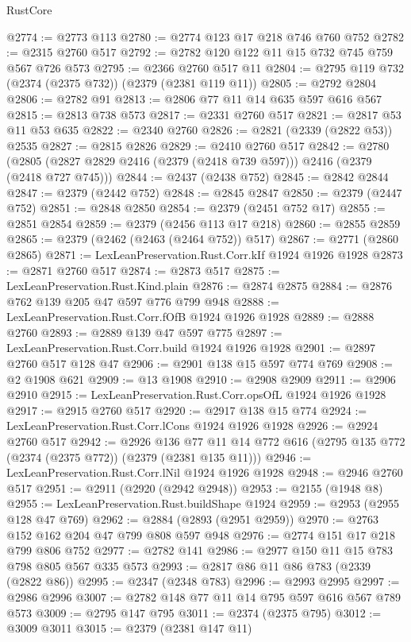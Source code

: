 \begin{lexlean}{RustCore}
\begin{coremodule}
@2774 := @2773 @113
@2780 := @2774 @123 @17 @218 @746 @760 @752
@2782 := @2315 @2760 @517
@2792 := @2782 @120 @122 @11 @15 @732 @745 @759 @567 @726 @573
@2795 := @2366 @2760 @517 @11
@2804 := @2795 @119 @732 (@2374 (@2375 @732)) (@2379 (@2381 @119 @11))
@2805 := @2792 @2804
@2806 := @2782 @91
@2813 := @2806 @77 @11 @14 @635 @597 @616 @567
@2815 := @2813 @738 @573
@2817 := @2331 @2760 @517
@2821 := @2817 @53 @11 @53 @635
@2822 := @2340 @2760
@2826 := @2821 (@2339 (@2822 @53)) @2535
@2827 := @2815 @2826
@2829 := @2410 @2760 @517
@2842 := @2780 (@2805 (@2827 @2829 @2416 (@2379 (@2418 @739 @597))) @2416 (@2379 (@2418 @727 @745)))
@2844 := @2437 (@2438 @752)
@2845 := @2842 @2844
@2847 := @2379 (@2442 @752)
@2848 := @2845 @2847
@2850 := @2379 (@2447 @752)
@2851 := @2848 @2850
@2854 := @2379 (@2451 @752 @17)
@2855 := @2851 @2854
@2859 := @2379 (@2456 @113 @17 @218)
@2860 := @2855 @2859
@2865 := @2379 (@2462 (@2463 (@2464 @752)) @517)
@2867 := @2771 (@2860 @2865)
@2871 := LexLeanPreservation.Rust.Corr.kIf @1924 @1926 @1928
@2873 := @2871 @2760 @517
@2874 := @2873 @517
@2875 := LexLeanPreservation.Rust.Kind.plain
@2876 := @2874 @2875
@2884 := @2876 @762 @139 @205 @47 @597 @776 @799 @948
@2888 := LexLeanPreservation.Rust.Corr.fOfB @1924 @1926 @1928
@2889 := @2888 @2760
@2893 := @2889 @139 @47 @597 @775
@2897 := LexLeanPreservation.Rust.Corr.build @1924 @1926 @1928
@2901 := @2897 @2760 @517 @128 @47
@2906 := @2901 @138 @15 @597 @774 @769
@2908 := @2 @1908 @621
@2909 := @13 @1908
@2910 := @2908 @2909
@2911 := @2906 @2910
@2915 := LexLeanPreservation.Rust.Corr.opsOfL @1924 @1926 @1928
@2917 := @2915 @2760 @517
@2920 := @2917 @138 @15 @774
@2924 := LexLeanPreservation.Rust.Corr.lCons @1924 @1926 @1928
@2926 := @2924 @2760 @517
@2942 := @2926
    @136
    @77
    @11
    @14
    @772
    @616
    (@2795 @135 @772 (@2374 (@2375 @772)) (@2379 (@2381 @135 @11)))
@2946 := LexLeanPreservation.Rust.Corr.lNil @1924 @1926 @1928
@2948 := @2946 @2760 @517
@2951 := @2911 (@2920 (@2942 @2948))
@2953 := @2155 (@1948 @8)
@2955 := LexLeanPreservation.Rust.buildShape @1924
@2959 := @2953 (@2955 @128 @47 @769)
@2962 := @2884 (@2893 (@2951 @2959))
@2970 := @2763 @152 @162 @204 @47 @799 @808 @597 @948
@2976 := @2774 @151 @17 @218 @799 @806 @752
@2977 := @2782 @141
@2986 := @2977 @150 @11 @15 @783 @798 @805 @567 @335 @573
@2993 := @2817 @86 @11 @86 @783 (@2339 (@2822 @86))
@2995 := @2347 (@2348 @783)
@2996 := @2993 @2995
@2997 := @2986 @2996
@3007 := @2782 @148 @77 @11 @14 @795 @597 @616 @567 @789 @573
@3009 := @2795 @147 @795
@3011 := @2374 (@2375 @795)
@3012 := @3009 @3011
@3015 := @2379 (@2381 @147 @11)

\end{coremodule}
\end{lexlean}
